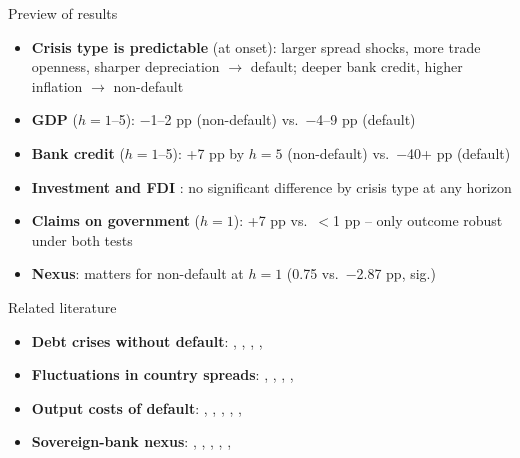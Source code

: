 \documentclass[aspectratio=169]{beamer}
\begin{document}
\begin{frame}{Preview of results}
 \footnotesize
  \vspace{0.4em}
  \begin{itemize}
    \item \textbf{Crisis type is predictable} (at onset): larger spread
    shocks, more trade openness, sharper depreciation $\to$ default;
    deeper bank credit, higher inflation $\to$ non-default
    \item \textbf{GDP} ($h=1$--5): $-$1--2 pp (non-default) vs.\
    $-$4--9 pp (default)
    \item \textbf{Bank credit} ($h=1$--5): +7 pp by $h=5$
    (non-default) vs.\ $-$40+ pp (default)
    \item \textbf{Investment and FDI } : no
    significant difference by crisis type at any horizon
    \item \textbf{Claims on government} ($h=1$): +7 pp vs.\ $<$1 pp --
    only outcome robust under both tests
    \item \textbf{Nexus}: matters for non-default at $h=1$ (0.75 vs.\
    $-$2.87 pp, sig.)
  \end{itemize}
\end{frame}



\begin{frame}{Related literature}
  \footnotesize
  \begin{itemize}
    \item \textbf{Debt crises without default}: \citet{pescatori2007adequately}, \citet{broner2013why}, \citet{aguiar2016quantitative}, \citet{krishnamurthy2017credit}, \citet{mitchener2021sovereign}
    \item \textbf{Fluctuations in country spreads}: \citet{uribeyue2006country}, \citet{arellano2008default}, \citet{mendozayue2012general}, \citet{bocola2016passthrough}, \citet{bahaj2020sovereign}
    \item \textbf{Output costs of default}: \citet{borensztein2009costs}, \citet{furceri2012costly}, \citet{trebesch2017output}, \citet{kuvshinov2019sovereigns}, \citet{levyyeyati2011elusive}, \citet{asonuma2024costs}
    \item \textbf{Sovereign-bank nexus}: \citet{gennaioli2014sovereign}, \citet{gennaioli2018banks}, \citet{acharya2015greatest}, \citet{dellariccia2018managing}, \citet{broner2014sovereign}, \citet{angelini2014negative}
  \end{itemize}

\end{frame}
\end{document}
